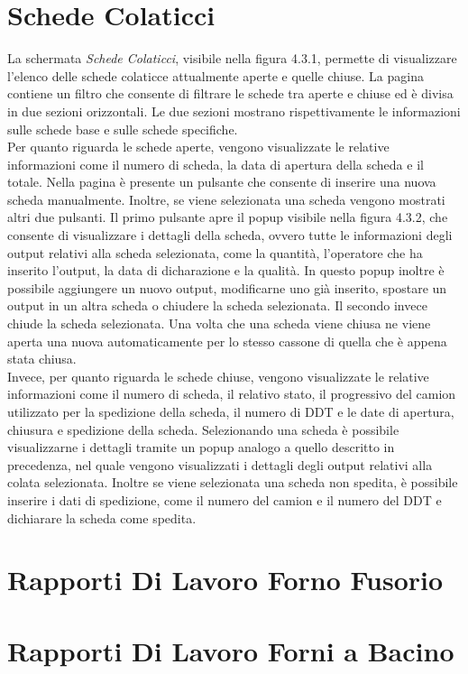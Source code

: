   \section{Schede Colaticci}
  La schermata \textit{Schede Colaticci}, visibile nella figura 4.3.1, permette di visualizzare l'elenco delle schede colaticce
  attualmente aperte e quelle chiuse. La pagina contiene un filtro che consente di filtrare le schede tra aperte e chiuse ed
  è divisa in due sezioni orizzontali. Le due sezioni mostrano rispettivamente le informazioni sulle schede base e sulle schede
  specifiche.\\
  Per quanto riguarda le schede aperte, vengono visualizzate le relative informazioni come il numero di scheda, la data
  di apertura della scheda e il totale. Nella pagina è presente un pulsante che consente di inserire una nuova
  scheda manualmente. Inoltre, se viene selezionata una scheda vengono mostrati altri due pulsanti. Il primo pulsante apre
  il popup visibile nella figura 4.3.2, che consente di visualizzare i dettagli della scheda, ovvero tutte le informazioni
  degli output relativi alla scheda selezionata, come la quantità, l'operatore che ha inserito l'output, la data di
  dicharazione e la qualità. In questo popup inoltre è possibile aggiungere un nuovo output, modificarne uno già inserito,
  spostare un output in un altra scheda o chiudere la scheda selezionata.
  Il secondo invece chiude la scheda selezionata. Una volta che una scheda viene chiusa ne viene aperta una nuova
  automaticamente per lo stesso cassone di quella che è appena stata chiusa.\\
  Invece, per quanto riguarda le schede chiuse, vengono visualizzate le relative informazioni come il numero di scheda,
  il relativo stato, il progressivo del camion utilizzato per la spedizione della scheda, il numero di DDT e le date di apertura,
  chiusura e spedizione della scheda. Selezionando una scheda è possibile visualizzarne i dettagli tramite un popup analogo a
  quello descritto in precedenza, nel quale vengono visualizzati i dettagli degli output relativi alla colata selezionata.
  Inoltre se viene selezionata una scheda non spedita, è possibile inserire i dati di spedizione, come il numero del camion
  e il numero del DDT e dichiarare la scheda come spedita.  
  \section{Rapporti Di Lavoro Forno Fusorio}

  \section{Rapporti Di Lavoro Forni a Bacino}
 
